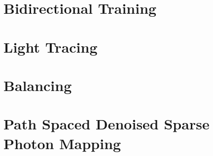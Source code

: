 \section{Bidirectional Training}

\section{Light Tracing}

\section{Balancing}

\section{Path Spaced Denoised Sparse Photon Mapping}

